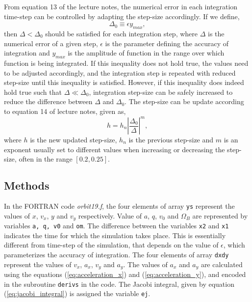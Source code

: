 \documentclass[a4paper]{article}
\begin{document}
	From equation 13 of the lecture notes, the numerical error in each integration time-step can be controlled by adapting the step-size accordingly. If we define,
	\begin{equation}
		\Delta_0 \equiv \epsilon y_{max},
		\label{eq:numerical_error}
	\end{equation}
	then \(\Delta < \Delta_0\) should be satisfied for each integration step, where \(\Delta\) is the numerical error of a given step, \(\epsilon\) is the parameter defining the accuracy of integration and \(y_{max}\) is the amplitude of function in the range over which function is being integrated. If this inequality does not hold true, the values need to be adjusted accordingly, and the integration step is repeated with reduced step-size until this inequality is satisfied. However, if this inequality does indeed hold true such that \(\Delta \ll \Delta_0\), integration step-size can be safely increased to reduce the difference between \(\Delta\) and \(\Delta_0\). The step-size can be update according to equation 14 of lecture notes, given as,
	\begin{equation}
		h = h_n \left| \frac{\Delta_0}{\Delta} \right| ^m,
		\label{eq:stepsize}
	\end{equation}
	where \(h\) is the new updated step-size, \(h_n\) is the previous step-size and \(m\) is an exponent usually set to different values when increasing or decreasing the step-size, often in the range \([0.2,0.25]\). 
	
		
		\subsection{Methods} \label{methods1}
			
		In the FORTRAN code \emph{orbit19.f}, the four elements of array \texttt{ys} represent the values of \(x\), \(v_x\), \(y\) and \(v_y\) respectively. Value of \(a\), \(q\), \(v_0\) and \(\Omega_B\) are represented by variables \texttt{a, q, v0} and \texttt{om}. The difference between the variables \texttt{x2} and \texttt{x1} indicates the time for which the simulation takes place. This is essentially different from time-step of the simulation, that depends on the value of \(\epsilon\), which parameterizes the accuracy of integration. The four elements of array \texttt{dxdy} represent the values of \(v_x\), \(a_x\), \(v_y\) and \(a_y\). The values of \(a_x\) and \(a_y\) are calculated using the equations (\ref{eq:acceleration_x}) and (\ref{eq:acceleration_y}), and encoded in the subroutine \texttt{derivs} in the code. The Jacobi integral, given by equation (\ref{eq:jacobi_integral}) is assigned the variable \texttt{ej}. \\
		
\end{document}
